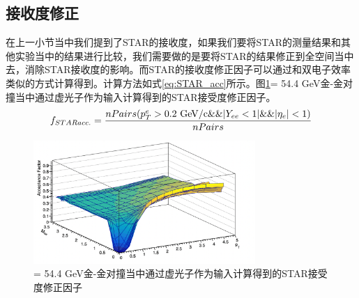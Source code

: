 \subsection{接收度修正}
\label{chap:pair_acc}

在上一小节当中我们提到了STAR的接收度，如果我们要将STAR的测量结果和其他实验当中的结果进行比较，我们需要做的是要将STAR的结果修正到全空间当中去，消除STAR接收度的影响。而STAR的接收度修正因子可以通过和双电子效率类似的方式计算得到。计算方法如式\ref{eq:STAR_acc}所示。图\ref{fig:Accep_VP}\sNN = 54.4 GeV金-金对撞当中通过虚光子作为输入计算得到的STAR接受度修正因子。
\begin{equation}
    \label{eq:STAR_acc}
    f_{STAR acc.} = \frac{nPairs(p_T^{e} > 0.2~{\rm GeV/c} \&\& |Y_{ee} < 1| \&\& |\eta_e| < 1)}{nPairs}
\end{equation}
\begin{figure}[htb]
    \begin{center}
    \includegraphics[width=0.75\textwidth,clip]{figures/Chapter4/Accep_VP.png}
    \end{center}
    \caption[通过虚光子作为输入计算得到的STAR接受度修正因子]{\sNN = 54.4 GeV金-金对撞当中通过虚光子作为输入计算得到的STAR接受度修正因子}
    \label{fig:Accep_VP}
\end{figure}

